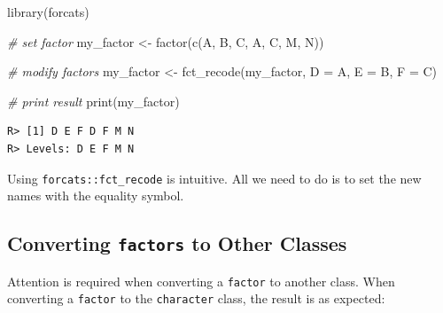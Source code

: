 \documentclass[
  12pt,
]{book}
\newenvironment{Shaded}{\begin{snugshade}}{\end{snugshade}}
\newcommand{\CommentTok}[1]{\textcolor[rgb]{0.37,0.37,0.37}{\textit{#1}}}
\newcommand{\FunctionTok}[1]{\textcolor[rgb]{0,0,0}{#1}}
\newcommand{\NormalTok}[1]{#1}
\newcommand{\OtherTok}[1]{\textcolor[rgb]{0.37,0.37,0.37}{#1}}
\newcommand{\StringTok}[1]{\textcolor[rgb]{0.5,0.5,0.5}{#1}}
\begin{document}
\begin{Shaded}
\begin{Highlighting}[]
\FunctionTok{library}\NormalTok{(forcats)}

\CommentTok{\# set factor}
\NormalTok{my\_factor }\OtherTok{\textless{}{-}} \FunctionTok{factor}\NormalTok{(}\FunctionTok{c}\NormalTok{(}\StringTok{\textquotesingle{}A\textquotesingle{}}\NormalTok{, }\StringTok{\textquotesingle{}B\textquotesingle{}}\NormalTok{, }\StringTok{\textquotesingle{}C\textquotesingle{}}\NormalTok{, }
                      \StringTok{\textquotesingle{}A\textquotesingle{}}\NormalTok{, }\StringTok{\textquotesingle{}C\textquotesingle{}}\NormalTok{, }\StringTok{\textquotesingle{}M\textquotesingle{}}\NormalTok{, }
                      \StringTok{\textquotesingle{}N\textquotesingle{}}\NormalTok{))}

\CommentTok{\# modify factors}
\NormalTok{my\_factor }\OtherTok{\textless{}{-}} \FunctionTok{fct\_recode}\NormalTok{(my\_factor,}
                        \StringTok{\textquotesingle{}D\textquotesingle{}} \OtherTok{=} \StringTok{\textquotesingle{}A\textquotesingle{}}\NormalTok{,}
                        \StringTok{\textquotesingle{}E\textquotesingle{}} \OtherTok{=} \StringTok{\textquotesingle{}B\textquotesingle{}}\NormalTok{,}
                        \StringTok{\textquotesingle{}F\textquotesingle{}} \OtherTok{=} \StringTok{\textquotesingle{}C\textquotesingle{}}\NormalTok{)}

\CommentTok{\# print result}
\FunctionTok{print}\NormalTok{(my\_factor)}
\end{Highlighting}
\end{Shaded}

\begin{verbatim}
R> [1] D E F D F M N
R> Levels: D E F M N
\end{verbatim}

Using \texttt{forcats::fct\_recode} is intuitive. All we need to do is to set the new names with the equality symbol.

\hypertarget{converting-factors-to-other-classes}{%
\subsection{\texorpdfstring{Converting \texttt{factors} to Other Classes}{Converting factors to Other Classes}}\label{converting-factors-to-other-classes}}

Attention is required when converting a \texttt{factor} to another class. When converting a \texttt{factor} to the \texttt{character} class, the result is as expected:
\end{document}
